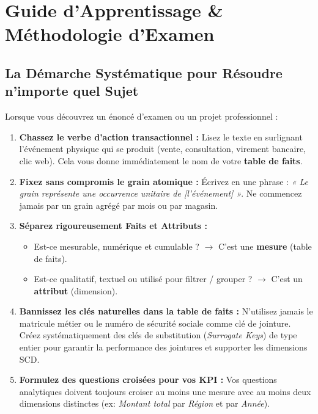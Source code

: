 \documentclass[11pt, a4paper]{article}
\begin{document}
\section{Guide d'Apprentissage \& Méthodologie d'Examen}

\subsection{La Démarche Systématique pour Résoudre n'importe quel Sujet}
Lorsque vous découvrez un énoncé d'examen ou un projet professionnel :
\begin{enumerate}
    \item \textbf{Chassez le verbe d'action transactionnel :} Lisez le texte en surlignant l'événement physique qui se produit (vente, consultation, virement bancaire, clic web). Cela vous donne immédiatement le nom de votre \textbf{table de faits}.
    \item \textbf{Fixez sans compromis le grain atomique :} Écrivez en une phrase : \textit{« Le grain représente une occurrence unitaire de [l'événement] »}. Ne commencez jamais par un grain agrégé par mois ou par magasin.
    \item \textbf{Séparez rigoureusement Faits et Attributs :}
    \begin{itemize}
        \item Est-ce mesurable, numérique et cumulable ? $\rightarrow$ C'est une \textbf{mesure} (table de faits).
        \item Est-ce qualitatif, textuel ou utilisé pour filtrer / grouper ? $\rightarrow$ C'est un \textbf{attribut} (dimension).
    \end{itemize}
    \item \textbf{Bannissez les clés naturelles dans la table de faits :} N'utilisez jamais le matricule métier ou le numéro de sécurité sociale comme clé de jointure. Créez systématiquement des clés de substitution (\textit{Surrogate Keys}) de type entier pour garantir la performance des jointures et supporter les dimensions SCD.
    \item \textbf{Formulez des questions croisées pour vos KPI :} Vos questions analytiques doivent toujours croiser au moins une mesure avec au moins deux dimensions distinctes (ex: \textit{Montant total} par \textit{Région} et par \textit{Année}).
\end{enumerate}
\end{document}
